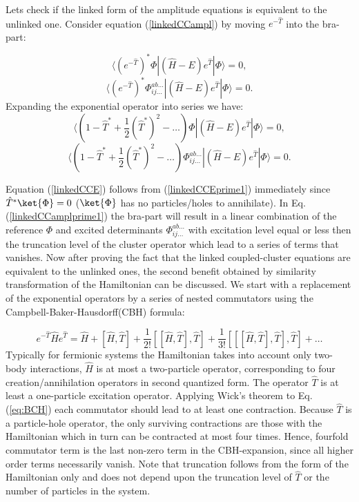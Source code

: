\documentclass[twoside,english]{uiofysmaster}
\begin{document}
Lets check if the linked form of the amplitude equations is equivalent to the unlinked one. Consider equation (\ref{linkedCCampl}) by moving $e^{-\hat{T}}$ into the bra-part:

\begin{equation}\label{linkedCCEprime}
\langle(e^{-\hat{T}})^*\Phi|(\hat{H}-E)e^{\hat{T}}|\Phi\rangle = 0,
\end{equation}
\begin{equation}\label{linkedCCamplprime}
\langle(e^{-\hat{T}})^*\Phi_{ij\dots}^{ab\dots}|(\hat{H}-E)e^{\hat{T}}|\Phi\rangle = 0.
\end{equation}
Expanding the exponential operator into series we have:
\begin{equation}\label{linkedCCEprime1}
\langle(1 - \hat{T}^* + \frac{1}{2}(\hat{T}^*)^2 - \dots)\Phi|(\hat{H}-E)e^{\hat{T}}|\Phi\rangle = 0,
\end{equation}
\begin{equation}\label{linkedCCamplprime1}
\langle(1 - \hat{T}^* + \frac{1}{2}(\hat{T}^*)^2- \dots)\Phi_{ij\dots}^{ab\dots}|(\hat{H}-E)e^{\hat{T}}|\Phi\rangle = 0.
\end{equation}

Equation (\ref{linkedCCE}) follows from (\ref{linkedCCEprime1}) immediately since $\hat{T}^*\ket{\Phi}=0$ ($\ket{\Phi}$ has no particles/holes to annihilate).
In Eq. (\ref{linkedCCamplprime1}) the bra-part will result in a linear combination of the reference $\Phi$ and excited determinants $\Phi_{ij\dots}^{ab\dots}$ with excitation level equal or less then the truncation level of the cluster operator which lead to a series of terms that vanishes.
Now after proving the fact that the linked coupled-cluster equations are equivalent to the unlinked ones, the second benefit obtained by similarity transformation of the Hamiltonian can be discussed. We start with a replacement of the exponential operators by a series of nested commutators using the Campbell-Baker-Hausdorff(CBH) formula:

\begin{equation}\label{eq:BCH}
e^{-\hat{T}}\hat{H}e^{\hat{T}} = \hat{H} + [\hat{H},\hat{T}] + \frac{1}{2!}[[\hat{H},\hat{T}],\hat{T}] + \frac{1}{3!}[[[\hat{H},\hat{T}],\hat{T}],\hat{T}] + \dots
\end{equation}
Typically for fermionic systems the Hamiltonian takes into account only two-body interactions, $\hat{H}$ is at most a two-particle operator, corresponding to four creation/annihilation operators in second quantized form. The operator $\hat{T}$ is at least a one-particle excitation operator. 
Applying Wick's theorem to Eq. (\ref{eq:BCH}) each commutator should lead to at least one contraction. Because $\hat{T}$ is a particle-hole operator, the only surviving contractions are those with the Hamiltonian which in turn can be contracted at most four times. Hence, fourfold commutator term is the last non-zero term in the CBH-expansion, since all higher order terms necessarily vanish.
Note that truncation follows from the form of the Hamiltonian only and does not depend upon the truncation level of $\hat{T}$ or the number of particles in the system.
\end{document}
